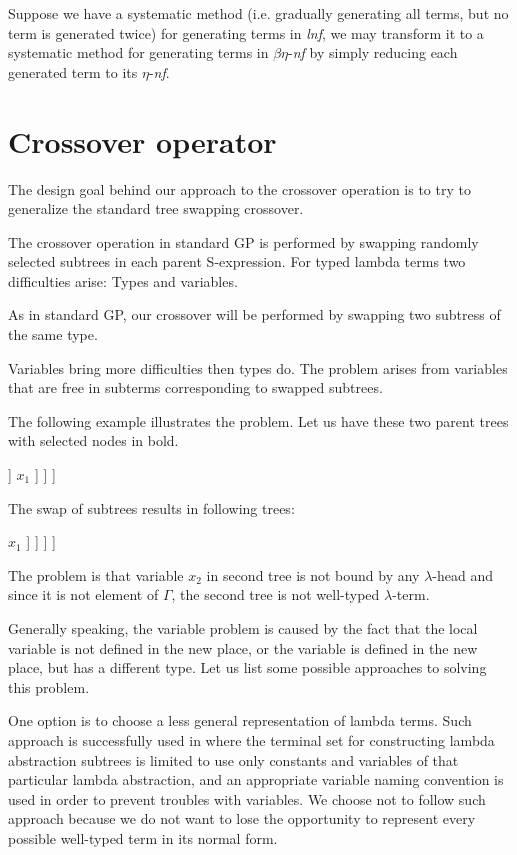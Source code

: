 \documentclass{sig-alternate}
\newcommand{\Lets}{Let us\xspace}
\newcommand{\lterm}{$\lambda$-term\xspace}
\newcommand{\lh}[1]{\lambda #1}
\newcommand{\enf}{$\eta$-\textit{nf}\xspace}
\newcommand{\benf}{$\beta\eta$-\textit{nf}\xspace}
\newcommand{\lnf}{\textit{lnf}\xspace}
\begin{document}
Suppose we have a systematic method (i.e. gradually generating all terms, but no term is generated twice) for generating terms in \lnf,
we may transform it to a systematic method for generating terms in \benf by simply reducing each generated term to its \enf.  


\section{Crossover operator}
\label{crossover}

The design goal behind our approach to the crossover operation is
to try to generalize the standard tree swapping crossover.


The crossover operation in standard GP is performed 
by swapping randomly selected subtrees in each parent 
S-expre\-ssion.
For typed lambda terms two difficulties arise: Types and variables.

As in standard GP, our crossover will be performed by swapping
two subtress of the same type.

Variables bring more difficulties then types do.
The problem arises from variables that are free in subterms corresponding to swapped subtrees. 

The following example illustrates the problem. \Lets have these two
parent trees with selected nodes in bold.

\vfill

\Tree [.$\lh{x_1}$ [.f [.$\lh{x_2}$ [.\textbf{g} $x_2$ c ] ] $x_1$ ] ]
\Tree [.$\lh{x_1}$ [.h $x_1$ $\mathbf{x_1}$ ] ]

\vfill

The swap of subtrees results in following trees:

\vfill

\Tree [.$\lh{x_1}$ [.f [.$\lh{x_2}$ $\mathbf{x_1}$ ] $x_1$ ] ]
\Tree [.$\lh{x_1}$ [.h $x_1$ [.\textbf{g} $\mathbf{x_2}$ \textbf{c} ] ] ]
 
\vfill 
 
The problem is that variable $x_2$ in second tree
is not bound by any $\lambda$-head and since
it is not element of $\Gamma$, the second tree is not well-typed \lterm.  

Generally speaking, the variable problem is caused by the fact that the local variable is not defined in the new place, or the variable is defined in the new place, but has a different type. Let us list some possible approaches to solving this problem.

One option is to choose a less general representation of lambda terms.
Such approach is successfully used in \cite{yu01} where the 
terminal set for constructing lambda abstraction subtrees 
is limited to use only constants and variables of that particular
lambda abstraction, and an appropriate variable naming convention is used in order to prevent troubles with variables.
We choose not to follow such approach because we do not want to
lose the opportunity to represent every possible well-typed 
term in its normal form.
\end{document}

